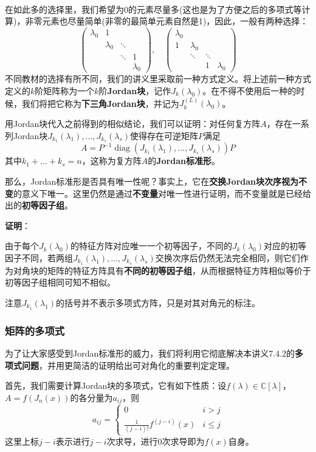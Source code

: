 \documentclass[a4paper,UTF8,fontset=windows,AutoFakeBold]{ctexart}
\DeclareMathOperator{\diag}{diag}
\newcommand*{\note}{\noindent *}
\newcommand{\proo}[1]{{\vspace{5pt}\kaishu\noindent\textbf{证明}：\vspace{-3pt}
\begin{compactitem}
    \item[] #1
\end{compactitem}
}}
\begin{document}
\

在如此多的选择里，我们希望为0的元素尽量多(这也是为了方便之后的多项式等计算)，非零元素也尽量简单(非零的最简单元素自然是1)，因此，一般有两种选择：
$$\begin{pmatrix}\lambda_0&1&&\\ &\lambda_0&\ddots&\\ &&\ddots&1\\ &&&\lambda_0\end{pmatrix},\quad\begin{pmatrix}\lambda_0&&&\\1&\lambda_0&&\\ &\ddots&\ddots&\\ &&1&\lambda_0\end{pmatrix}$$
不同教材的选择有所不同，我们的讲义里采取前一种方式定义。将上述前一种方式定义的$k$阶矩阵称为一个$k$阶\textbf{Jordan块}，记作$J_k(\lambda_0)$。在不得不使用后一种的时候，我们将把它称为\textbf{下三角Jordan块}，并记为$J_k^{(L)}(\lambda_0)$。

用Jordan块代入之前得到的相似结论，我们可以证明：对任何复方阵$A$，存在一系列Jordan块$J_{k_1}(\lambda_1),\dots,J_{k_s}(\lambda_s)$使得存在可逆矩阵$P$满足
$$A=P^{-1}\diag(J_{k_1}(\lambda_1),\dots,J_{k_s}(\lambda_s))P$$
其中$k_1+\dots+k_s=n$，这称为复方阵$A$的\textbf{Jordan标准形}。

那么，Jordan标准形是否具有唯一性呢？事实上，它在\textbf{交换Jordan块次序视为不变}的意义下唯一。这里仍然是通过\textbf{不变量}对唯一性进行证明，而不变量就是已经给出的\textbf{初等因子组}。

\proo{
    由于每个$J_k(\lambda_0)$的特征方阵对应唯一一个初等因子，不同的$J_k(\lambda_0)$对应的初等因子不同，若两组$J_{k_1}(\lambda_1),\dots,J_{k_s}(\lambda_s)$交换次序后仍然无法完全相同，则它们作为对角块的矩阵的特征方阵具有\textbf{不同的初等因子组}，从而根据特征方阵相似等价于初等因子组相同可知不相似。
}

\note 注意$J_{k_1}(\lambda_1)$的括号并不表示多项式方阵，只是对其对角元的标注。

\subsubsection{矩阵的多项式}
为了让大家感受到Jordan标准形的威力，我们将利用它彻底解决本讲义7.4.2的\textbf{多项式问题}，并用更简洁的证明给出可对角化的重要判定定理。

首先，我们需要计算Jordan块的多项式，它有如下性质：设$f(\lambda)\in\mathbb{C}[\lambda]$，$A=f(J_n(x))$的各分量为$a_{ij}$，则
$$a_{ij}=\begin{cases}0&i>j\\\frac{1}{(j-i)!}f^{(j-i)}(x)&i\le j\end{cases}$$
这里上标$j-i$表示进行$j-i$次求导，进行0次求导即为$f(x)$自身。
\end{document}
